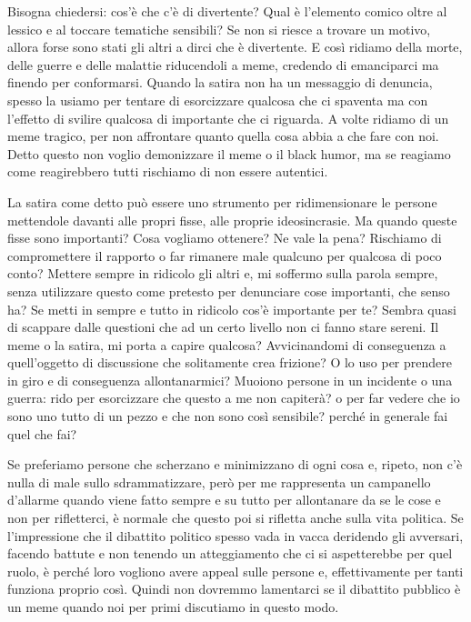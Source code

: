 \documentclass[12pt]{book} %
\begin{document}
\begin{mdframed}[linewidth=1pt]
\bigskip

Bisogna chiedersi: cos'è che c'è di divertente? Qual è l'elemento comico oltre al lessico e al
toccare tematiche sensibili? Se non si riesce a trovare un motivo, allora forse sono stati gli altri a dirci che è
divertente. E così ridiamo della morte, delle guerre e delle malattie riducendoli a meme, credendo di emanciparci ma
finendo per conformarsi. Quando la satira non ha un messaggio di denuncia, spesso la usiamo per tentare di esorcizzare
qualcosa che ci spaventa ma con l'effetto di svilire qualcosa di importante che ci riguarda. A volte ridiamo di un meme
tragico, per non affrontare quanto quella cosa abbia a che fare con noi. Detto questo non voglio demonizzare il meme o
il black humor, ma se reagiamo come reagirebbero tutti rischiamo di non essere autentici.

La satira come detto può essere uno strumento per ridimensionare le persone mettendole davanti alle propri fisse, alle proprie ideosincrasie. Ma quando queste fisse sono importanti? Cosa vogliamo ottenere? Ne vale la pena? Rischiamo di compromettere il rapporto o far rimanere male qualcuno per qualcosa di poco conto? Mettere sempre in ridicolo gli altri e, mi soffermo sulla parola sempre, senza utilizzare questo come pretesto per denunciare cose importanti, che senso ha? Se metti in sempre e tutto in ridicolo cos'è importante per te? Sembra quasi di scappare dalle questioni che ad un certo livello non ci fanno stare sereni.
Il meme o la satira, mi porta a capire qualcosa? Avvicinandomi di conseguenza a quell'oggetto di discussione che solitamente crea frizione? O lo uso per prendere in giro e di conseguenza allontanarmici? Muoiono persone in un incidente o una guerra: rido per esorcizzare che questo a me non capiterà? o per far vedere che io sono uno tutto di un pezzo e che non sono così sensibile? perché in generale fai quel che fai?

Se preferiamo persone che scherzano e minimizzano di ogni cosa e, ripeto, non c'è nulla di male sullo sdrammatizzare, però per me rappresenta un campanello d'allarme quando viene fatto sempre e su tutto per allontanare da se le cose e non per rifletterci, è normale che questo poi si rifletta anche sulla vita politica. Se l'impressione che il dibattito politico spesso vada in vacca deridendo gli avversari, facendo battute e non tenendo un atteggiamento che ci si aspetterebbe per quel ruolo, è perché loro vogliono avere appeal sulle persone e, effettivamente per tanti funziona proprio così.
Quindi non dovremmo lamentarci se il dibattito pubblico è un meme quando noi per primi discutiamo in questo modo.


\end{mdframed}
\end{document}
